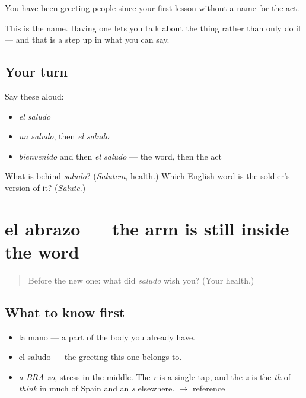 \begin{grammarlens}[title={What you've built}]
You have been greeting people since your first lesson without a name for the act.

This is the name. Having one lets you talk about the thing rather than only do it — and that is a step up in what you can say.
\end{grammarlens}

\subsection*{Your turn}
Say these aloud:

\begin{itemize}
\raggedright
  \item \emph{el saludo}
  \item \emph{un saludo}, then \emph{el saludo}
  \item \emph{bienvenido} and then \emph{el saludo} — the word, then the act
\end{itemize}

\begin{tcolorbox}[breakable,colback=teal!4,colframe=teal!35!black,title={Before you move on}]
What is behind \emph{saludo}? (\emph{Salutem}, health.) Which English word is the soldier's version of it? (\emph{Salute}.)
\end{tcolorbox}
\section[el abrazo]{el abrazo — the arm is still inside the word}

\label{lesson:ES-C282-abrazo}



\begin{quote}
Before the new one: what did \emph{saludo} wish you? (Your health.)
\end{quote}

\subsection*{What to know first}
\begin{itemize}
\raggedright
  \item la mano — a part of the body you already have.
  \item el saludo — the greeting this one belongs to.
\end{itemize}

\begin{sounds}
\begin{itemize}
\raggedright
  \item \emph{a-BRA-zo}, stress in the middle. The \emph{r} is a single tap, and the \emph{z} is the \emph{th} of \emph{think} in much of Spain and an \emph{s} elsewhere. $\to$ reference
\end{itemize}
\end{sounds}

